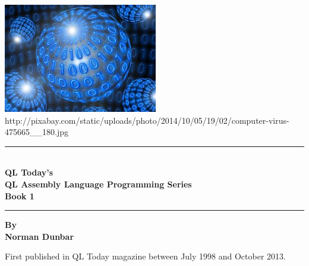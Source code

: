 \begin{titlepage}

\begin{center}

\includegraphics[scale=1.5]{images/coverLogo.jpg}
\linebreak
\tiny{http://pixabay.com/static/uploads/photo/2014/10/05/19/02/computer-virus-475665\_\_180.jpg}


\bigskip

{\rule{\linewidth}{0.3mm}} \\[0.4cm]
\Huge{\textbf{QL Today's}} \\
\Huge{\textbf{QL Assembly Language Programming Series}} \\
\Huge{\textbf{Book 1}} \\[0.6cm]
{\rule{\linewidth}{0.6mm}}

\bigskip
\bigskip
\bigskip
\bigskip
\LARGE{\textbf{By}} \\
\Huge{\textbf{Norman Dunbar}}
\linebreak

\vfill

\small{First published in QL Today magazine between July 1998 and October 2013.}

\end{center}

\end{titlepage}
